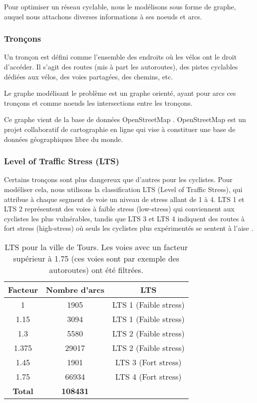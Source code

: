 Pour optimiser un réseau cyclable, nous le modélisons sous forme de graphe, auquel nous attachons diverses informations à ses noeuds et arcs.

\subsubsection{Tronçons}\label{sect:troncons}

Un tronçon est défini comme l'ensemble des endroits où les vélos ont le droit d'accéder. Il s'agit des routes (mis à part les autoroutes), des pistes cyclables dédiées aux vélos, des voies partagées, des chemins, etc. 

Le graphe modélisant le problème est un graphe orienté, ayant pour arcs ces tronçons et comme noeuds les intersections entre les tronçons.

Ce graphe vient de la base de données OpenStreetMap \cite{OSM}. OpenStreetMap est un projet collaboratif de cartographie en ligne qui vise à constituer une base de données géographiques libre du monde. 

\subsubsection{Level of Traffic Stress (LTS)}\label{sect:lts}

Certains tronçons sont plus dangereux que d'autres pour les cyclistes. Pour modéliser cela, nous utilisons la classification LTS (Level of Traffic Stress), qui attribue à chaque segment de voie un
niveau de stress allant de 1 à 4. LTS 1 et LTS 2 représentent des voies à faible stress (low-stress) qui conviennent aux cyclistes les plus vulnérables, tandis que LTS 3 et LTS 4 indiquent des routes à fort stress (high-stress) où seuls les cyclistes plus expérimentés se sentent à l'aise \cite{kent_karner}.

\begin{table}[h]
\centering
\caption{LTS pour la ville de Tours. Les voies avec un facteur supérieur à 1.75 (ces voies sont par exemple des autoroutes) ont été filtrées.}
\vspace{0.5cm}
\begin{tabular}{|c|c|c}
\hline
\textbf{Facteur} & \textbf{Nombre d'arcs} & \multicolumn{1}{c|}{\textbf{LTS}} \\
\hline
1 & 1905 & \multicolumn{1}{c|}{LTS 1 (Faible stress)} \\
1.15 &3094 &\multicolumn{1}{c|}{LTS 1 (Faible stress)}\\
1.3 &5580 &\multicolumn{1}{c|}{LTS 2 (Faible stress)}\\
1.375& 29017& \multicolumn{1}{c|}{LTS 2 (Faible stress)}\\
1.45 &1901 &\multicolumn{1}{c|}{LTS 3 (Fort stress)}\\
1.75 &66934 &\multicolumn{1}{c|}{LTS 4 (Fort stress)}\\
\hline 
\textbf{Total} & \textbf{108431} & \\ 
\cline{1-2}
\end{tabular}
\label{table:lts_tours}
\end{table} 

